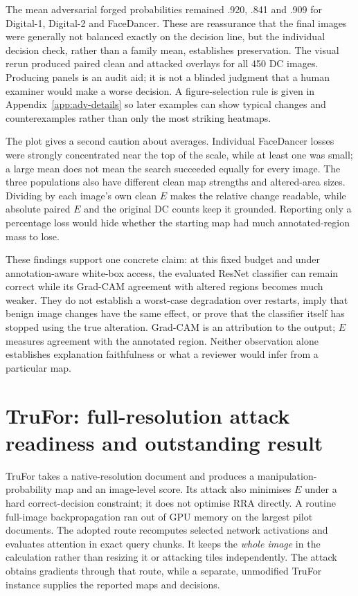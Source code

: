 The mean adversarial forged probabilities remained .920, .841 and .909 for Digital-1, Digital-2 and FaceDancer. These are reassurance that the final images were generally not balanced exactly on the decision line, but the individual decision check, rather than a family mean, establishes preservation. The visual rerun produced paired clean and attacked overlays for all 450 DC images. Producing panels is an audit aid; it is not a blinded judgment that a human examiner would make a worse decision. A figure-selection rule is given in Appendix~\ref{app:adv-details} so later examples can show typical changes and counterexamples rather than only the most striking heatmaps.

The plot gives a second caution about averages. Individual FaceDancer losses were strongly concentrated near the top of the scale, while at least one was small; a large mean does not mean the search succeeded equally for every image. The three populations also have different clean map strengths and altered-area sizes. Dividing by each image's own clean $E$ makes the relative change readable, while absolute paired $E$ and the original DC counts keep it grounded. Reporting only a percentage loss would hide whether the starting map had much annotated-region mass to lose.

These findings support one concrete claim: at this fixed budget and under annotation-aware white-box access, the evaluated ResNet classifier can remain correct while its Grad-CAM agreement with altered regions becomes much weaker. They do not establish a worst-case degradation over restarts, imply that benign image changes have the same effect, or prove that the classifier itself has stopped using the true alteration. Grad-CAM is an attribution to the output; $E$ measures agreement with the annotated region. Neither observation alone establishes explanation faithfulness or what a reviewer would infer from a particular map.

\section{TruFor: full-resolution attack readiness and outstanding result}
\label{sec:adv-trufor}

TruFor takes a native-resolution document and produces a manipulation-probability map and an image-level score. Its attack also minimises $E$ under a hard correct-decision constraint; it does not optimise RRA directly. A routine full-image backpropagation ran out of GPU memory on the largest pilot documents. The adopted route recomputes selected network activations and evaluates attention in exact query chunks. It keeps the \emph{whole image} in the calculation rather than resizing it or attacking tiles independently. The attack obtains gradients through that route, while a separate, unmodified TruFor instance supplies the reported maps and decisions.

